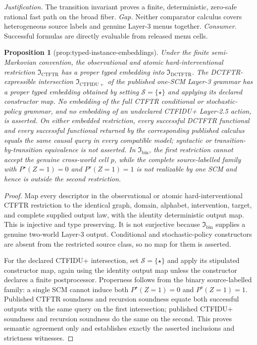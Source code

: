 \documentclass{article}
\newtheorem{proposition}{Proposition}
\begin{document}
\par\smallskip\noindent \textit{Justification.} The transition invariant proves a finite, deterministic, zero-safe rational fast path on the broad fiber. \textit{Gap.} Neither comparator calculus covers heterogeneous source labels and genuine Layer-3 menus together. \textit{Consumer.} Successful formulas are directly evaluable from released menu cells.

\begin{proposition}[prop:typed-instance-embeddings]\label{prop:typed-instance-embeddings}
Under the finite semi-Markovian convention, the observational and atomic hard-interventional restriction \(\mathfrak I_{\mathrm{CTFTR}}\) has a proper typed embedding into \(\mathfrak I_{\mathrm{DCTFTR}}\). The DCTFTR-expressible intersection \(\mathfrak I_{\mathrm{CTFIDU+}}\) of the published one-SCM Layer-3 grammar has a proper typed embedding obtained by setting \(\mathcal S=\{\star\}\) and applying its declared constructor map. No embedding of the full CTFTR conditional or stochastic-policy grammar, and no embedding of an undeclared CTFIDU+ Layer-2.5 action, is asserted. On either embedded restriction, every successful DCTFTR functional and every successful functional returned by the corresponding published calculus equals the same causal query in every compatible model; syntactic or transition-by-transition equivalence is not asserted. In \(\mathfrak I_{\mathrm{bin}}\), the first restriction cannot accept the genuine cross-world cell \(p\), while the complete source-labelled family with \(P^\star(Z=1)=0\) and \(P^s(Z=1)=1\) is not realizable by one SCM and hence is outside the second restriction.
\end{proposition}
\begin{proof}
Map every descriptor in the observational or atomic hard-interventional CTFTR restriction to the identical graph, domain, alphabet, intervention, target, and complete supplied output law, with the identity deterministic output map.  This is injective and type preserving.  It is not surjective because \(\mathfrak I_{\mathrm{bin}}\) supplies a genuine two-world Layer-3 output.  Conditional and stochastic-policy constructors are absent from the restricted source class, so no map for them is asserted.

For the declared CTFIDU+ intersection, set \(\mathcal S=\{\star\}\) and apply its stipulated constructor map, again using the identity output map unless the constructor declares a finite postprocessor.  Properness follows from the binary source-labelled family: a single SCM cannot induce both \(P^\star(Z=1)=0\) and \(P^s(Z=1)=1\).  Published CTFTR soundness and recursion soundness equate both successful outputs with the same query on the first intersection; published CTFIDU+ soundness and recursion soundness do the same on the second.  This proves semantic agreement only and establishes exactly the asserted inclusions and strictness witnesses.
\end{proof}
\end{document}
